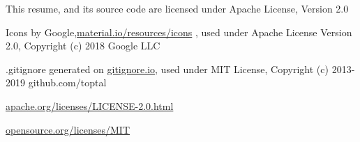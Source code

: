\hspace{1pt}

\tiny{

	
This resume, and its source code are licensed under Apache License, Version 2.0

Icons by Google,{\secondaryColor\href{https://material.io/resources/icons}{material.io/resources/icons} }, used under Apache License Version 2.0, Copyright (c) 2018 Google LLC

.gitignore generated on {\secondaryColor\href{https://gitignore.io}{gitignore.io}}, used under MIT License, Copyright (c) 2013-2019 github.com/toptal

\secondaryColor\href{https://www.apache.org/licenses/LICENSE-2.0.html}{apache.org/licenses/LICENSE-2.0.html}

\secondaryColor\href{https://opensource.org/licenses/MIT}{opensource.org/licenses/MIT}


}